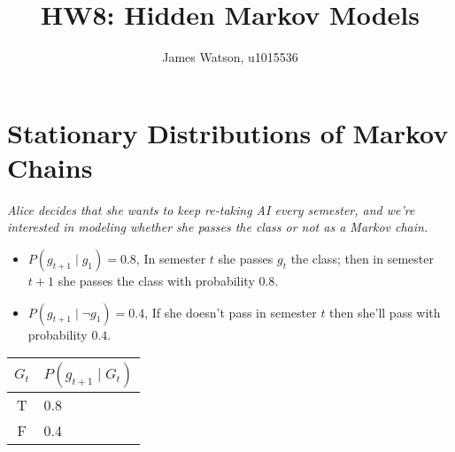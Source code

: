 \documentclass[fleqn]{hw8}
\title{HW8: Hidden Markov Models}
\institute{University of Utah}
\author{James Watson, u1015536}
\begin{document}
\maketitle
\section{Stationary Distributions of Markov Chains}

\textit{Alice decides that she wants to keep re-taking AI every semester, and we're interested in modeling whether she passes the class or not as a Markov chain.}
\begin{itemize}
	\item $ P(g_{t+1} \mid g_{1}) = 0.8 $, In semester $t$ she passes $g_t$ the class; then in semester $t+1$ she passes the class with probability $0.8$.
	\item  $ P(g_{t+1} \mid \neg g_{1}) = 0.4 $, If she doesn't pass in semester $t$ then she'll pass with probability $0.4$.
\end{itemize}
  
\begin{tabular}[t]{c|l}
	$G_{t}$ & $P(g_{t+1} \mid G_{t})$ \\ \hline
	T   & 0.8 \\
	F   & 0.4
\end{tabular}
\end{document}
